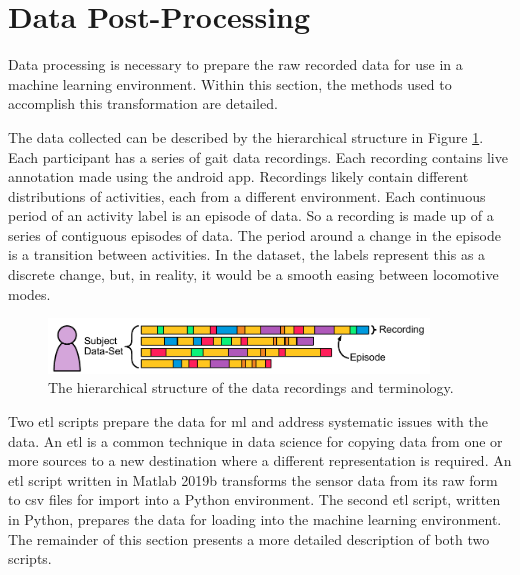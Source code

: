

\section{Data Post-Processing}
Data processing is necessary to prepare the raw recorded data for use in a machine learning environment. Within this section, the methods used to accomplish this transformation are detailed.

The data collected can be described by the hierarchical structure in Figure \ref{fig:methods-data-hierachy}. Each participant has a series of gait data recordings. Each recording contains live annotation made using the android app. Recordings likely contain different distributions of activities, each from a different environment. Each continuous period of an activity label is an episode of data. So a recording is made up of a series of contiguous episodes of data. The period around a change in the episode is a transition between activities. In the dataset, the labels represent this as a discrete change, but, in reality, it would be a smooth easing between locomotive modes.

\begin{figure}[hbt]
    \centering
    \includegraphics[width=0.9\textwidth]{content/3-Methods/Data_Terminology.pdf}
    \caption{The hierarchical structure of the data recordings and terminology.}
    \label{fig:methods-data-hierachy}
\end{figure}

Two \acrfull{etl} scripts prepare the data for \acrshort{ml} and address systematic issues with the data. An \acrshort{etl} is a common technique in data science for copying data from one or more sources to a new destination where a different representation is required. An \acrshort{etl} script written in Matlab 2019b transforms the sensor data from its raw form to \acrshort{csv} files for import into a Python environment. The second \acrshort{etl} script, written in Python, prepares the data for loading into the machine learning environment. The remainder of this section presents a more detailed description of both two scripts.

